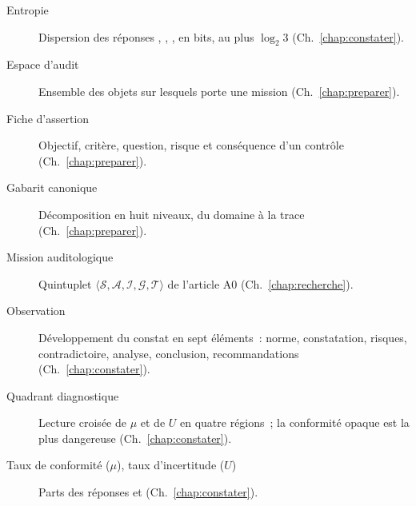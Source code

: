 \begin{description}
    \item[Entropie] Dispersion des réponses \OUI{}, \NON{}, \NEK{}, en bits,
          au plus $\log_2 3$ (Ch.~\ref{chap:constater}).
    \item[Espace d'audit] Ensemble des objets sur lesquels porte une
          mission (Ch.~\ref{chap:preparer}).
    \item[Fiche d'assertion] Objectif, critère, question, risque et
          conséquence d'un contrôle (Ch.~\ref{chap:preparer}).
    \item[Gabarit canonique] Décomposition en huit niveaux, du domaine à la
          trace (Ch.~\ref{chap:preparer}).
    \item[Mission auditologique] Quintuplet $\langle \mathcal{S},
          \mathcal{A}, \mathcal{I}, \mathcal{G}, \mathcal{T} \rangle$ de
          l'article A0 (Ch.~\ref{chap:recherche}).
    \item[Observation] Développement du constat en sept éléments~: norme,
          constatation, risques, contradictoire, analyse, conclusion,
          recommandations (Ch.~\ref{chap:constater}).
    \item[Quadrant diagnostique] Lecture croisée de $\mu$ et de $U$ en quatre
          régions~; la conformité opaque est la plus dangereuse
          (Ch.~\ref{chap:constater}).
    \item[Taux de conformité ($\mu$), taux d'incertitude ($U$)] Parts des
          réponses \OUI{} et \NEK{} (Ch.~\ref{chap:constater}).
\end{description}
